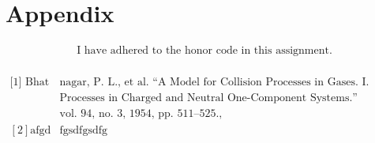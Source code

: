 \documentclass[12pt]{article}
\begin{document}
	\section{Appendix}
	\begin{align*}
		\text{I have adhered to the honor code in this assignment.}
	\end{align*}\\
	$\begin{aligned}
		\text{{[1]} Bhat}&\text{nagar, P. L., et al. “A Model for Collision Processes in Gases. I. Small Amplitude}\\&\text{Processes in Charged and Neutral One-Component Systems.” Physical Review,}\\& \text{vol. 94, no. 3, 1954, pp. 511–525., https://doi.org/10.1103/physrev.94.511.} \\
		{[2]} \text{afgd}&\text{fgsdfgsdfg}
	\end{aligned}$\\

	
\end{document}
